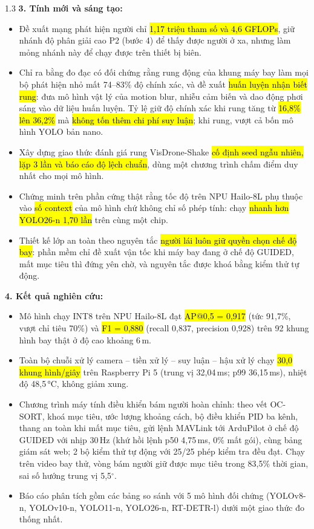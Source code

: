 \begin{spacing}{1.3}
\noindent\textbf{3. Tính mới và sáng tạo:}
\begin{itemize}
\item Đề xuất mạng phát hiện người \sd{} chỉ \hl{1,17 triệu tham số và 4,6 GFLOPs}, giữ nhánh độ phân giải cao P2 (bước 4) để thấy được người ở xa, nhưng làm mỏng nhánh này để chạy được trên thiết bị biên.
\item Chỉ ra bằng đo đạc có đối chứng rằng rung động của khung máy bay làm mọi bộ phát hiện nhỏ mất 74--83\% độ chính xác, và đề xuất \hl{huấn luyện nhận biết rung}: đưa mô hình vật lý của motion blur, nhiễu cảm biến và dao động phơi sáng vào dữ liệu huấn luyện. Tỷ lệ giữ độ chính xác khi rung tăng từ \hl{16,8\% lên 36,2\%} mà \hl{không tốn thêm chi phí suy luận}; khi rung, \sd{} vượt cả bốn mô hình YOLO bản nano.
\item Xây dựng giao thức đánh giá rung VisDrone-Shake \hl{cố định seed ngẫu nhiên, lặp 3 lần và báo cáo độ lệch chuẩn}, dùng một chương trình chấm điểm duy nhất cho mọi mô hình.
\item Chứng minh trên phần cứng thật rằng tốc độ trên NPU Hailo-8L phụ thuộc vào \hl{số context} của mô hình chứ không chỉ số phép tính: \sd{} chạy \hl{nhanh hơn YOLO26-n 1,70 lần} trên cùng một chip.
\item Thiết kế lớp an toàn theo nguyên tắc \hl{người lái luôn giữ quyền chọn chế độ bay}: phần mềm chỉ đề xuất vận tốc khi máy bay đang ở chế độ GUIDED, mất mục tiêu thì đứng yên chờ, và nguyên tắc được khoá bằng kiểm thử tự động.
\end{itemize}

\noindent\textbf{4. Kết quả nghiên cứu:}
\begin{itemize}
\item Mô hình chạy INT8 trên NPU Hailo-8L đạt \hl{AP@0,5 = 0,917} (tức 91,7\%, vượt chỉ tiêu 70\%) và \hl{F1 = 0,880} (recall 0,837, precision 0,928) trên 92 khung hình bay thật ở độ cao khoảng 6\,m.
\item Toàn bộ chuỗi xử lý camera -- tiền xử lý -- suy luận -- hậu xử lý chạy \hl{30,0 khung hình/giây} trên Raspberry Pi 5 (trung vị 32,04\,ms; p99 36,15\,ms), nhiệt độ 48,5\,°C, không giảm xung.
\item Chương trình máy tính điều khiển bám người hoàn chỉnh: theo vết OC-SORT, khoá mục tiêu, ước lượng khoảng cách, bộ điều khiển PID ba kênh, thang an toàn khi mất mục tiêu, gửi lệnh MAVLink tới ArduPilot ở chế độ GUIDED với nhịp 30\,Hz (khứ hồi lệnh p50 4,75\,ms, 0\% mất gói), cùng bảng giám sát web; 2 bộ kiểm thử tự động với 25/25 phép kiểm tra đều đạt. Chạy trên video bay thử, vòng bám người giữ được mục tiêu trong 83,5\% thời gian, sai số hướng trung vị 5,5$^\circ$.
\item Báo cáo phân tích gồm các bảng so sánh với 5 mô hình đối chứng (YOLOv8-n, YOLOv10-n, YOLO11-n, YOLO26-n, RT-DETR-l) dưới một giao thức đo thống nhất.
\end{itemize}


\end{spacing}
